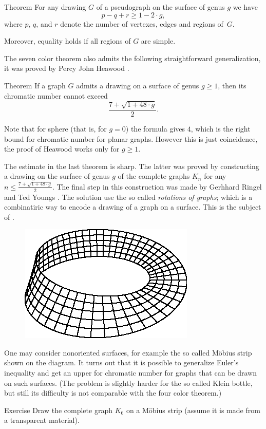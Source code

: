 \begin{thm}{Theorem}\label{thm:euler>=}
For any drawing $G$ of a pseudograph on the surface of genus $g$ we have
\[p-q+r\ge 1-2\cdot g,\]
where $p$, $q$, and $r$ denote the number of vertexes, edges and regions of~$G$.

Moreover, equality holds if all regions of $G$ are simple.
\end{thm}

The seven color theorem also admits the following straightforward generalization, it was proved by Percy John Heawood \cite{heawood}.

\begin{thm}{Theorem}
If a graph $G$ admits a drawing on a surface of genus $g\ge 1$, 
then its chromatic number cannot exceed 
\[\frac{7+\sqrt{1+48\cdot g}}2.\]
\end{thm}

Note that for sphere (that is, for $g=0$) the formula gives $4$, which is the right bound for chromatic number for planar graphs. 
However this is just coincidence, the proof of Heawood works only for $g\ge 1$.

The estimate in the last theorem is sharp.
The latter was proved by constructing a drawing on the surface of genus $g$
of the complete graphs $K_n$ for any $n\le\frac{7+\sqrt{1+48\cdot g}}2$.
The final step in this construction was made by Gerhhard Ringel and Ted Youngs \cite{ringel-youngs}.
The solution use the so called \emph{rotations of graphs}; which is a combinatiric way to encode a drawing of a graph on a surface.
This is the subject of \cite[Chapter 10]{hartsfield-ringel}.

\begin{figure}
\vskip-0mm
\centering
\includegraphics{asy/moebius}
\vskip-0mm
\end{figure}

One may consider nonoriented surfaces, for example the so called M\"obius strip shown on the diagram.
It turns out that it is possible to generalize Euler's inequality and get an upper for chromatic number for graphs that can be drawn on such surfaces.
(The problem is slightly harder for the so called Klein bottle, but still its difficulty is not comparable with the four color theorem.)

\begin{thm}{Exercise}
Draw the complete graph $K_6$ on a M\"obius strip (assume it is made from a transparent material).
\end{thm}


 
